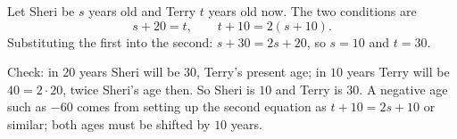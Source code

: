 Let Sheri be $s$ years old and Terry $t$ years old now. The two conditions are
\[
s+20=t,\qquad t+10=2(s+10).
\]
Substituting the first into the second: $s+30=2s+20$, so $s=10$ and $t=30$.

Check: in $20$ years Sheri will be $30$, Terry's present age; in $10$ years Terry will be $40=2\cdot20$, twice Sheri's age then. So Sheri is $\boxed{10}$ and Terry is $\boxed{30}$. A negative age such as $-60$ comes from setting up the second equation as $t+10=2s+10$ or similar; both ages must be shifted by $10$ years.
